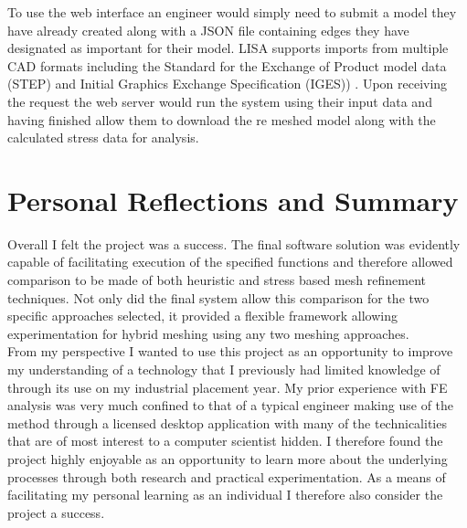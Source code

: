 
\noindent
To use the web interface an engineer would simply need to submit a model they have already created  along with a JSON file containing edges they have designated as important for their model. LISA supports imports from multiple CAD formats including the Standard for the Exchange of Product model data (STEP) and Initial Graphics Exchange Specification (IGES)) \cite{LISAManual}. Upon receiving the request the web server would run the system using their input data and having finished allow them to download the re meshed model along with the calculated stress data for analysis.


\section{Personal Reflections and Summary}

\noindent
Overall I felt the project was a success. The final software solution was evidently capable of facilitating execution of the specified functions and therefore allowed comparison to be made of both heuristic and stress based mesh refinement techniques. Not only did the final system allow this comparison for the two specific approaches selected, it provided a flexible framework allowing experimentation for hybrid meshing using any two meshing approaches. \\ 

\noindent
From my perspective I wanted to use this project as an opportunity to improve my understanding of a technology that I previously had limited knowledge of through its use on my industrial placement year. My prior experience with FE analysis was very much confined to that of a typical engineer making use of the method through a licensed desktop application with many of the technicalities that are of most interest to a computer scientist hidden. I therefore found the project highly enjoyable as an opportunity to learn more about the underlying processes through both research and practical experimentation. As a means of facilitating my personal learning as an individual I therefore also consider the project a success.

